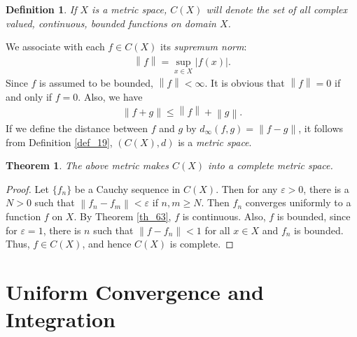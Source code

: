 \documentclass[10pt]{book}
\newtheorem{definition}{Definition}[chapter]
\newtheorem{theorem}{Theorem}[chapter]
\theoremstyle{definition}
\numberwithin{equation}{chapter}
\begin{document}
\medskip

\begin{definition}
If $X$ is a metric space, $C(X)$ will denote the set of all complex valued, continuous, bounded functions on domain $X$.
\end{definition}

\medskip

We associate with each $f \in C(X)$ its {\em supremum norm}:
\begin{align*}
    \left\|f\right\| = \sup_{x \in X} \left|f(x)\right|.
\end{align*}
Since $f$ is assumed to be bounded, $\left\|f\right\| < \infty$. It is obvious that $\left\|f\right\| = 0$ if and only if $f = 0$. Also, we have
\begin{align*}
    \left\|f + g\right\| \leq \left\|f\right\| + \left\|g\right\|.
\end{align*}
If we define the distance between $f$ and $g$ by $d_\infty(f,g) = \left\|f - g\right\|$, it follows from Definition \ref{def_19}, $(C(X),d)$ is a {\em metric space}.

\medskip

\begin{theorem}
The above metric makes $C(X)$ into a complete metric space.
\end{theorem}
\begin{proof}
Let $\{f_n\}$ be a Cauchy sequence in $C(X)$. Then for any $\varepsilon > 0$, there is a $N > 0$ such that $\left\|f_n - f_m\right\| < \varepsilon$ if $n,m \geq N$. Then $f_n$ converges uniformly to a function $f$ on $X$. By Theorem \ref{th_63}, $f$ is continuous. Also, $f$ is bounded, since for $\varepsilon = 1$, there is $n$ such that $\left\|f - f_n\right\| < 1$ for all $x \in X$ and $f_n$ is bounded. Thus, $f \in C(X)$, and hence $C(X)$ is complete.
\end{proof}


\medskip




\section{Uniform Convergence and Integration}
\end{document}
